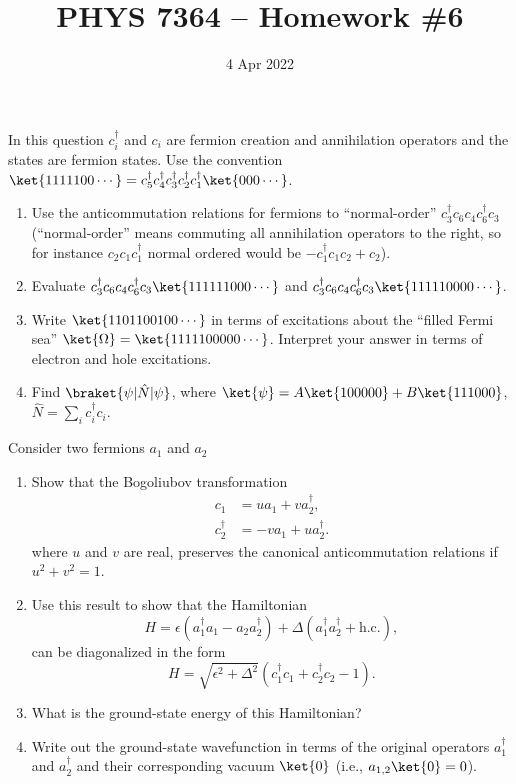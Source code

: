 \documentclass{jhwhw}
\author{}
\title{PHYS 7364 -- Homework \#6}
\date{4 Apr 2022}
\begin{document}

In this question $c_{i}^{\dagger}$ and $c_{i}$ are fermion creation and annihilation operators and the states are fermion states.
Use the convention $\ket{1111100\cdots} = c_{5}^{\dagger} c_{4}^{\dagger}c_{3}^{\dagger} c_{2}^{\dagger} c_{1}^{\dagger} \ket{000 \cdots}$.
\begin{enumerate}
  \item Use the anticommutation relations for fermions to ``normal-order'' $c_{3}^{\dagger} c_{6} c_{4} c_{6}^{\dagger} c_{3}$ (``normal-order'' means commuting all annihilation operators to the right, so for instance $ c_{2}c_{1 }c_1^{\dagger}$ normal ordered would be $-c_{1}^{\dagger} c_{1}c_{2} + c_{2}$).
  \item Evaluate $c_{3}^{\dagger} c_{6} c_{4} c_{6}^{\dagger} c_{3}\ket{111111000\cdots}$ and $c_{3}^{\dagger} c_{6} c_{4} c_{6}^{\dagger} c_{3}\ket{111110000\cdots}$.
  \item Write $\ket{1101100100\cdots}$ in terms of excitations about the ``filled Fermi sea'' $\ket{\Omega} = \ket{1111100000\cdots}$.  Interpret your answer in terms of electron and hole excitations.
  \item Find $\braket{\psi | \hat{N} | \psi}$, where $\ket{\psi} = A\ket{100000} + B \ket{111000}$, $\hat{N} = \sum_{i} c_{i}^{\dagger} c_{i}$.
\end{enumerate}


Consider two fermions $a_{1}$ and $a_{2}$
\begin{enumerate}
  \item Show that the Bogoliubov transformation
        \begin{equation}
          \label{eq:1}
          \begin{aligned}
            c_{1} & = u a_{1} + v a_{2}^{\dagger}, \\
            c_{2}^{\dagger} & = - v a_{1} + u a_{2}^{\dagger}.
          \end{aligned}
        \end{equation}
        where $u$ and $v$ are real, preserves the canonical anticommutation relations if $u^{2} + v^{2} = 1$.
  \item Use this result to show that the Hamiltonian
        \begin{equation}
          \label{eq:2}
          H = \epsilon (a_{1}^{\dagger} a_{1} - a_{2} a_{2}^{\dagger}) + \Delta (a_{1}^{\dagger} a_{2}^{\dagger} + \mathrm{h.c.}),
        \end{equation}
        can be diagonalized in the form
        \begin{equation}
          \label{eq:3}
          H = \sqrt{\epsilon^{2} + \Delta^{2}}(c_{1}^{\dagger} c_{1} + c_{2}^{\dag} c_{2} - 1).
        \end{equation}
  \item What is the ground-state energy of this Hamiltonian?
  \item Write out the ground-state wavefunction in terms of the original operators $a_{1}^{\dagger}$ and $a_{2}^{\dagger}$ and their corresponding vacuum $\ket{0}$ (i.e., $a_{1,2} \ket{0} = 0$).
\end{enumerate}
\end{document}
